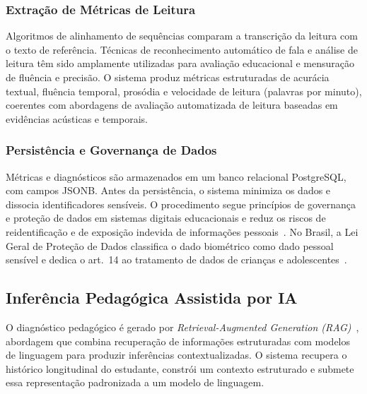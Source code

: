 \documentclass[12pt]{article}
\begin{document}
\subsubsection{Extração de Métricas de Leitura}

Algoritmos de alinhamento de sequências comparam a transcrição da leitura com o texto de referência. Técnicas de reconhecimento automático de fala e análise de leitura têm sido amplamente utilizadas para avaliação educacional e mensuração de fluência e precisão. O sistema produz métricas estruturadas de acurácia textual, fluência temporal, prosódia e velocidade de leitura (palavras por minuto), coerentes com abordagens de avaliação automatizada de leitura baseadas em evidências acústicas e temporais.

\subsubsection{Persistência e Governança de Dados}

Métricas e diagnósticos são armazenados em um banco relacional PostgreSQL, com campos JSONB. Antes da persistência, o sistema minimiza os dados e dissocia identificadores sensíveis. O procedimento segue princípios de governança e proteção de dados em sistemas digitais educacionais e reduz os riscos de reidentificação e de exposição indevida de informações pessoais~\cite{cavoukian2011privacy}. No Brasil, a Lei Geral de Proteção de Dados classifica o dado biométrico como dado pessoal sensível e dedica o art.~14 ao tratamento de dados de crianças e adolescentes~\cite{brasil2018lgpd}.

\subsection{Inferência Pedagógica Assistida por IA}

O diagnóstico pedagógico é gerado por \textit{Retrieval-Augmented Generation (RAG)}~\cite{lewis2020rag}, abordagem que combina recuperação de informações estruturadas com modelos de linguagem para produzir inferências contextualizadas. O sistema recupera o histórico longitudinal do estudante, constrói um contexto estruturado e submete essa representação padronizada a um modelo de linguagem.
\end{document}
